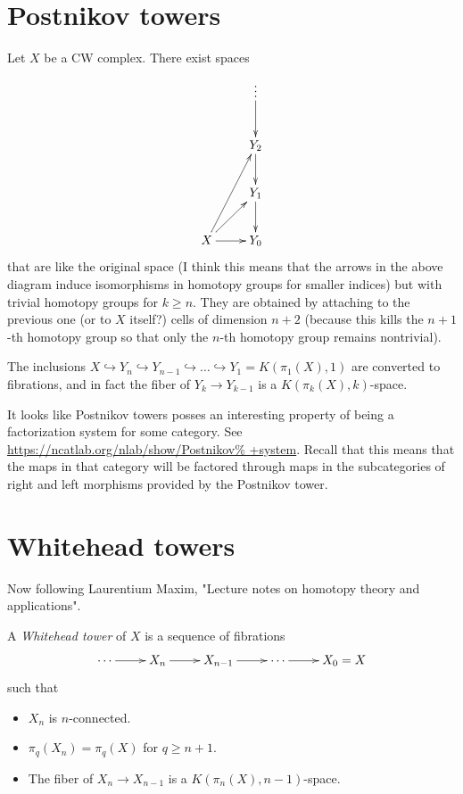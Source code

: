 \section{Postnikov towers}
\label{section-postnikov-towers}
Let $X$ be a CW complex. There exist spaces
$$
\xymatrix{
&\vdots\ar[d]\\
&Y_2\ar[d]\\
&Y_1\ar[d]\\
X\ar[uur]\ar[ur]\ar[r]&Y_0
}
$$
that are like the original space
(I think this means that the arrows in the
above diagram induce isomorphisms in
homotopy groups for smaller indices)
but with trivial homotopy groups for $k\geq
n$.
They are obtained by attaching to the
previous one
(or to $X$ itself?)
cells of dimension $n+2$
(because this kills the $n+1$-th homotopy
group
so that only the $n$-th homotopy group
remains nontrivial).

The inclusions
$X\hookrightarrow Y_{n}\hookrightarrow
Y_{n-1}\hookrightarrow
\ldots\hookrightarrow Y_{1}=K(\pi_{1}(X),1)$
 are converted to fibrations,
and in fact the fiber of $Y_{k}\to Y_{k-1}$
is a $K(\pi_{k}(X),k)$-space.

\begin{remark}
\label{remark-postn-tower-some-kind-facto}
It looks like Postnikov towers posses an
interesting property
of being a factorization system for some
category.
See
\url{https://ncatlab.org/nlab/show/Postnikov%
+system}.
Recall that this means that the maps in that
category
will be factored through maps in the
subcategories of right
and left morphisms provided by the Postnikov
tower.
\end{remark}


\section{Whitehead towers}
\label{section-whitehead-towers}

Now following Laurentium Maxim,
"Lecture notes on homotopy theory and
applications".

\begin{definition}
\label{definition-https-peopl-math-wisc}
A {\it Whitehead tower} of $X$ is a sequence
of fibrations
$$
\xymatrix{
\cdots\ar[r]&X_n\ar[r]&X_{n-1}\ar[r]&\cdots
\ar[r]&X_0=X
}
$$
such that
\begin{itemize}
\item $X_n$ is $n$-connected.
\item $\pi_{q}(X_{n})=\pi_{q}(X)$ for $q\geq
n+1$.
\item The fiber of $X_n\to  X_{n-1}$ is a
$K(\pi_{n}(X),n-1)$-space.
\end{itemize}
\end{definition}

